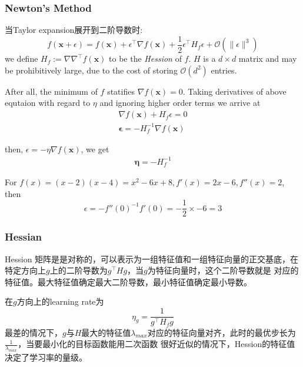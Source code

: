 \subsubsection{Newton's Method}
当Taylor expansion展开到二阶导数时:
\begin{equation}
    f(\mathbf{x} + \epsilon) = f(\mathbf{x}) + \epsilon^\top \nabla f(\mathbf{x}) + \frac{1}{2} \epsilon^\top H_f \epsilon 
    + \mathcal{O}(\|\epsilon\|^3)
\end{equation}
we define $H_f := \nabla \nabla ^\top f(\mathbf{x})$ to be the \textit{Hession} of $f$. $H$ is a $d \times  d$ matrix and may be
prohibitively large, due to the cost of storing $\mathcal{O}(d^2)$ entries.

\par

After all, the minimum of $f$ statifies $\nabla f(\mathbf{x}) = 0$.  Taking derivatives of above equtaion with regard to $\eta$ and 
ignoring higher order terms we arrive at 
\begin{equation}
   \begin{split}
    \nabla f(\mathbf{x}) + H_f \epsilon = 0 \\
    \mathbf{\epsilon} = -H_f^{-1} \nabla f(\mathbf{x})
   \end{split}
\end{equation}

then, $\epsilon = -\eta \nabla f(\mathbf{x})$, we get
\begin{equation}
    \begin{split}
        \mathbf{\eta} = -H_f^{-1}
    \end{split}
\end{equation}

For $f(x) = (x-2)(x-4) = x^2 - 6x + 8, f'(x) = 2x - 6, f''(x) = 2$, then
\begin{equation}
    \epsilon = -f''(0)^{-1} f'(0) = -\frac{1}{2} \times -6 = 3 
\end{equation}

\subsubsection{Hessian}
Hession 矩阵是是对称的，可以表示为一组特征值和一组特征向量的正交基底，在特定方向上$g$上的二阶导数为$g^\top H g$，当$g$为特征向量时，这个二阶导数就是
对应的特征值。最大特征值确定最大二阶导数，最小特征值确定最小导数。\par
在$g$方向上的learning rate为
\begin{equation}
    \eta_g = \frac{1}{g^\top H_f g}
\end{equation}
最差的情况下，$g$与$H$最大的特征值$\lambda_{max}$对应的特征向量对齐，此时的最优步长为$\frac{1}{\lambda_{max}}$，当要最小化的目标函数能用二次函数
很好近似的情况下，Hession的特征值决定了学习率的量级。

